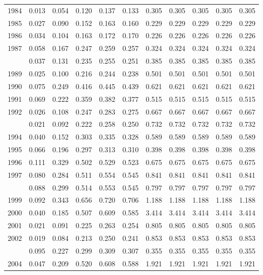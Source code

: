 \documentclass[
]{article}
\begin{document}
\begin{longtable}[t]{lrrrrrrrrrr}
1984 & 0.013 & 0.054 & 0.120 & 0.137 & 0.133 & 0.305 & 0.305 & 0.305 & 0.305 & 0.305\\
1985 & 0.027 & 0.090 & 0.152 & 0.163 & 0.160 & 0.229 & 0.229 & 0.229 & 0.229 & 0.229\\
1986 & 0.034 & 0.104 & 0.163 & 0.172 & 0.170 & 0.226 & 0.226 & 0.226 & 0.226 & 0.226\\
1987 & 0.058 & 0.167 & 0.247 & 0.259 & 0.257 & 0.324 & 0.324 & 0.324 & 0.324 & 0.324\\
\addlinespace
1988 & 0.037 & 0.131 & 0.235 & 0.255 & 0.251 & 0.385 & 0.385 & 0.385 & 0.385 & 0.385\\
1989 & 0.025 & 0.100 & 0.216 & 0.244 & 0.238 & 0.501 & 0.501 & 0.501 & 0.501 & 0.501\\
1990 & 0.075 & 0.249 & 0.416 & 0.445 & 0.439 & 0.621 & 0.621 & 0.621 & 0.621 & 0.621\\
1991 & 0.069 & 0.222 & 0.359 & 0.382 & 0.377 & 0.515 & 0.515 & 0.515 & 0.515 & 0.515\\
1992 & 0.026 & 0.108 & 0.247 & 0.283 & 0.275 & 0.667 & 0.667 & 0.667 & 0.667 & 0.667\\
\addlinespace
1993 & 0.021 & 0.092 & 0.222 & 0.258 & 0.250 & 0.732 & 0.732 & 0.732 & 0.732 & 0.732\\
1994 & 0.040 & 0.152 & 0.303 & 0.335 & 0.328 & 0.589 & 0.589 & 0.589 & 0.589 & 0.589\\
1995 & 0.066 & 0.196 & 0.297 & 0.313 & 0.310 & 0.398 & 0.398 & 0.398 & 0.398 & 0.398\\
1996 & 0.111 & 0.329 & 0.502 & 0.529 & 0.523 & 0.675 & 0.675 & 0.675 & 0.675 & 0.675\\
1997 & 0.080 & 0.284 & 0.511 & 0.554 & 0.545 & 0.841 & 0.841 & 0.841 & 0.841 & 0.841\\
\addlinespace
1998 & 0.088 & 0.299 & 0.514 & 0.553 & 0.545 & 0.797 & 0.797 & 0.797 & 0.797 & 0.797\\
1999 & 0.092 & 0.343 & 0.656 & 0.720 & 0.706 & 1.188 & 1.188 & 1.188 & 1.188 & 1.188\\
2000 & 0.040 & 0.185 & 0.507 & 0.609 & 0.585 & 3.414 & 3.414 & 3.414 & 3.414 & 3.414\\
2001 & 0.021 & 0.091 & 0.225 & 0.263 & 0.254 & 0.805 & 0.805 & 0.805 & 0.805 & 0.805\\
2002 & 0.019 & 0.084 & 0.213 & 0.250 & 0.241 & 0.853 & 0.853 & 0.853 & 0.853 & 0.853\\
\addlinespace
2003 & 0.095 & 0.227 & 0.299 & 0.309 & 0.307 & 0.355 & 0.355 & 0.355 & 0.355 & 0.355\\
2004 & 0.047 & 0.209 & 0.520 & 0.608 & 0.588 & 1.921 & 1.921 & 1.921 & 1.921 & 1.921\\

\end{longtable}
\end{document}

